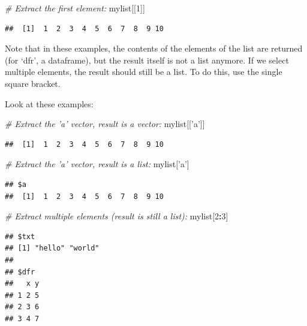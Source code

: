 \documentclass[]{book}
\newenvironment{Shaded}{\begin{snugshade}}{\end{snugshade}}
\newcommand{\CommentTok}[1]{\textcolor[rgb]{0.56,0.35,0.01}{\textit{#1}}}
\newcommand{\DecValTok}[1]{\textcolor[rgb]{0.00,0.00,0.81}{#1}}
\newcommand{\NormalTok}[1]{#1}
\newcommand{\OperatorTok}[1]{\textcolor[rgb]{0.81,0.36,0.00}{\textbf{#1}}}
\newcommand{\StringTok}[1]{\textcolor[rgb]{0.31,0.60,0.02}{#1}}
\begin{document}
\begin{Shaded}
\begin{Highlighting}[]
\CommentTok{# Extract the first element:}
\NormalTok{mylist[[}\DecValTok{1}\NormalTok{]]}
\end{Highlighting}
\end{Shaded}

\begin{verbatim}
##  [1]  1  2  3  4  5  6  7  8  9 10
\end{verbatim}

Note that in these examples, the contents of the elements of the list are returned (for `dfr', a dataframe), but the result itself is not a list anymore. If we select multiple elements, the result should still be a list. To do this, use the single square bracket.

Look at these examples:

\begin{Shaded}
\begin{Highlighting}[]
\CommentTok{# Extract the 'a' vector, result is a vector:}
\NormalTok{mylist[[}\StringTok{'a'}\NormalTok{]]}
\end{Highlighting}
\end{Shaded}

\begin{verbatim}
##  [1]  1  2  3  4  5  6  7  8  9 10
\end{verbatim}

\begin{Shaded}
\begin{Highlighting}[]
\CommentTok{# Extract the 'a' vector, result is a list:}
\NormalTok{mylist[}\StringTok{'a'}\NormalTok{]}
\end{Highlighting}
\end{Shaded}

\begin{verbatim}
## $a
##  [1]  1  2  3  4  5  6  7  8  9 10
\end{verbatim}

\begin{Shaded}
\begin{Highlighting}[]
\CommentTok{# Extract multiple elements (result is still a list):}
\NormalTok{mylist[}\DecValTok{2}\OperatorTok{:}\DecValTok{3}\NormalTok{]}
\end{Highlighting}
\end{Shaded}

\begin{verbatim}
## $txt
## [1] "hello" "world"
## 
## $dfr
##   x y
## 1 2 5
## 2 3 6
## 3 4 7
\end{verbatim}
\end{document}
